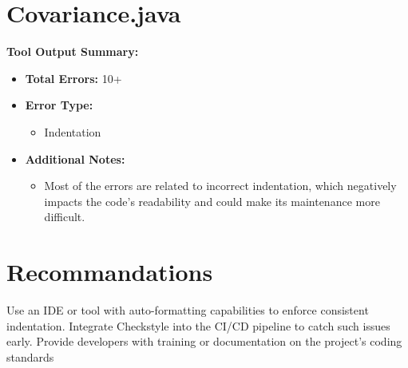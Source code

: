 \documentclass[twocolumn,10pt]{article}
\begin{document}
\begin{appendix}
\section{Covariance.java}
\textbf{Tool Output Summary:}
\begin{itemize}[itemsep=0pt, topsep=0pt, parsep=0pt, partopsep=0pt]
    \item \textbf{Total Errors:} 10+
    \item \textbf{Error Type:} 
    \begin{itemize}[itemsep=0pt, topsep=0pt, parsep=0pt, partopsep=0pt]
        \item Indentation
    \end{itemize}
    \item \textbf{Additional Notes:}
    \begin{itemize}[itemsep=0pt, topsep=0pt, parsep=0pt, partopsep=0pt]
        \item Most of the errors are related to incorrect indentation, which negatively impacts the code’s readability and could make its maintenance more difficult.
    \end{itemize}
\end{itemize}
\section{Recommandations}
Use an IDE or tool with auto-formatting capabilities to enforce consistent indentation. Integrate Checkstyle into the CI/CD pipeline to catch such issues early. Provide developers with training or documentation on the project's coding standards
\end{appendix}
\end{document}
